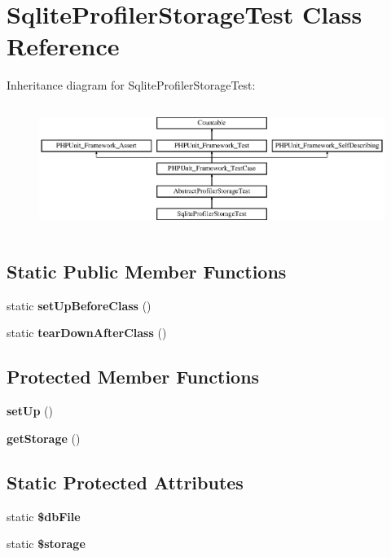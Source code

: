 \section{Sqlite\+Profiler\+Storage\+Test Class Reference}
\label{class_symfony_1_1_component_1_1_http_kernel_1_1_tests_1_1_profiler_1_1_sqlite_profiler_storage_test}
Inheritance diagram for Sqlite\+Profiler\+Storage\+Test\+:\begin{figure}[H]
\begin{center}
\leavevmode
\includegraphics[height=4.129793cm]{class_symfony_1_1_component_1_1_http_kernel_1_1_tests_1_1_profiler_1_1_sqlite_profiler_storage_test}
\end{center}
\end{figure}
\subsection*{Static Public Member Functions}
\begin{DoxyCompactItemize}
\item 
static {\bf set\+Up\+Before\+Class} ()
\item 
static {\bf tear\+Down\+After\+Class} ()
\end{DoxyCompactItemize}
\subsection*{Protected Member Functions}
\begin{DoxyCompactItemize}
\item 
{\bf set\+Up} ()
\item 
{\bf get\+Storage} ()
\end{DoxyCompactItemize}
\subsection*{Static Protected Attributes}
\begin{DoxyCompactItemize}
\item 
static {\bf \$db\+File}
\item 
static {\bf \$storage}
\end{DoxyCompactItemize}
